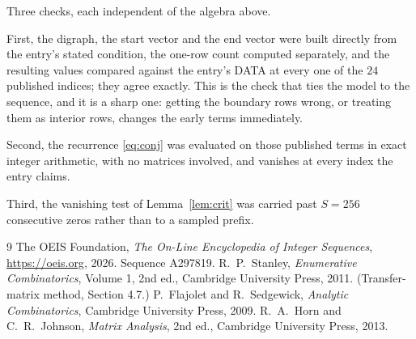 \documentclass[11pt,a4paper]{article}
\theoremstyle{plain}
\theoremstyle{definition}
\begin{document}
Three checks, each independent of the algebra above.

First, the digraph, the start vector and the end vector were built directly from the
entry's stated condition, the one-row count computed separately, and the resulting values
compared against the entry's DATA at every one of the $24$ published indices; they
agree exactly. This is the check that ties the model to the sequence, and it is a sharp one:
getting the boundary rows wrong, or treating them as interior rows, changes the early terms
immediately.

Second, the recurrence \eqref{eq:conj} was evaluated on those published terms in exact
integer arithmetic, with no matrices involved, and vanishes at every index the entry claims.

Third, the vanishing test of Lemma~\ref{lem:crit} was carried past $S=256$ consecutive
zeros rather than to a sampled prefix.

\begin{thebibliography}{9}
 The OEIS Foundation, \emph{The On-Line Encyclopedia of Integer
Sequences}, \url{https://oeis.org}, 2026. Sequence A297819.
 R.~P.~Stanley, \emph{Enumerative Combinatorics}, Volume 1, 2nd ed.,
Cambridge University Press, 2011. (Transfer-matrix method, Section 4.7.)
 P.~Flajolet and R.~Sedgewick, \emph{Analytic Combinatorics}, Cambridge
University Press, 2009.
 R.~A.~Horn and C.~R.~Johnson, \emph{Matrix Analysis}, 2nd ed., Cambridge
University Press, 2013.
\end{thebibliography}
\end{document}

